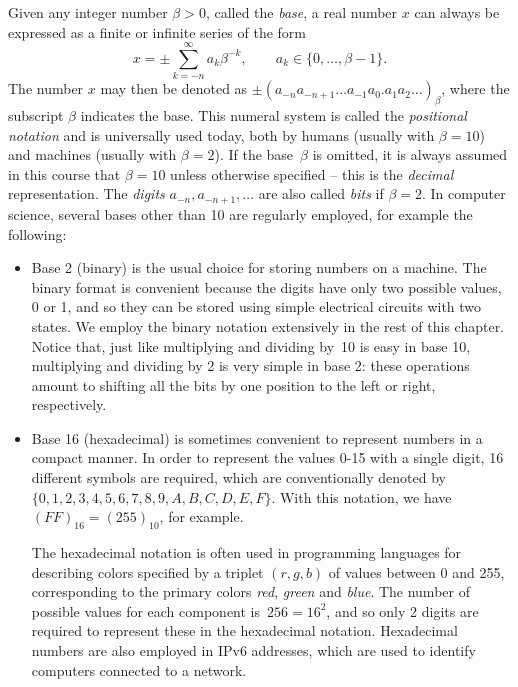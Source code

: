 Given any integer number $\beta > 0$, called the \emph{base},
a real number $x$ can always be expressed as a finite or infinite series of the form
\begin{equation}
    \label{eq:base_representation}
    x = \pm \sum_{k=-n}^{\infty} a_k \beta^{-k}, \qquad a_k \in \{0, \dotsc, \beta - 1\}.
\end{equation}
The number $x$ may then be denoted as $\pm (a_{-n} a_{-n+1}\dots a_{-1} a_{0}.a_{1} a_{2} \dots)_{\beta}$,
where the subscript $\beta$ indicates the base.
This numeral system is called the \emph{positional notation} and is universally used today,
both by humans (usually with $\beta=10$) and machines (usually with $\beta=2$).
If the base~$\beta$ is omitted,
it is always assumed in this course that $\beta = 10$ unless otherwise specified
-- this is the \emph{decimal} representation.
The \emph{digits} $a_{-n}, a_{-n+1}, \dotsc$ are also called \emph{bits} if $\beta = 2$.
In computer science, several bases other than 10 are regularly employed,
for example the following:
\begin{itemize}
    \item
        Base 2 (binary) is the usual choice for storing numbers on a machine.
        The binary format is convenient because the digits have only two possible values, 0 or 1,
        and so they can be stored using simple electrical circuits with two states.
        We employ the binary notation extensively in the rest of this chapter.
        Notice that, just like multiplying and dividing by~10 is easy in base 10,
        multiplying and dividing by 2 is very simple in base 2:
        these operations amount to shifting all the bits by one position to the left or right,
        respectively.

    \item
        Base 16 (hexadecimal) is sometimes convenient to represent numbers in a compact manner.
        In order to represent the values 0-15 with a single digit,
        16 different symbols are required, which are conventionally denoted by $\{0,1,2,3,4,5,6,7,8,9,A,B,C,D,E,F\}$.
        With this notation, we have $(FF)_{16} = (255)_{10}$, for example.

        The hexadecimal notation is often used in programming languages for describing colors specified by a triplet $(r,g,b)$ of values between 0 and 255,
        corresponding to the primary colors \emph{red}, \emph{green} and \emph{blue}.
        The number of possible values for each component is~$256 = 16^2$,
        and so only 2 digits are required to represent these in the hexadecimal notation.
        Hexadecimal numbers are also employed in IPv6 addresses,
        which are used to identify computers connected to a network.
\end{itemize}

